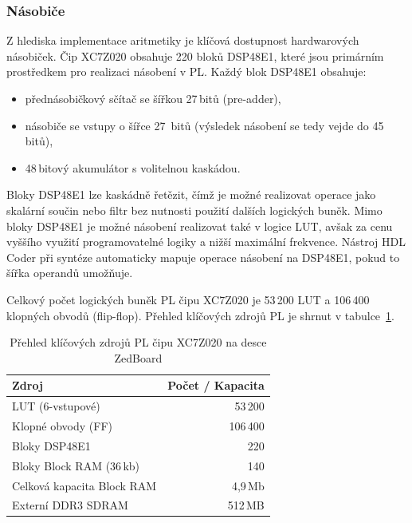 \subsubsection{Násobiče}

Z hlediska implementace aritmetiky je klíčová dostupnost hardwarových násobiček. Čip XC7Z020 obsahuje 220 bloků DSP48E1, které jsou primárním prostředkem pro realizaci násobení v PL. Každý blok DSP48E1 obsahuje:
\begin{itemize}
    \item přednásobičkový sčítač se šířkou 27\,bitů (pre-adder),
    \item násobiče se vstupy o šířce 27~bitů (výsledek násobení se tedy vejde do 45\,bitů),
    \item 48\,bitový akumulátor s volitelnou kaskádou.
\end{itemize}

Bloky DSP48E1 lze kaskádně řetězit, čímž je možné realizovat operace jako skalární součin nebo filtr bez nutnosti použití dalších logických buněk. Mimo bloky DSP48E1 je možné násobení realizovat také v logice LUT, avšak za cenu vyššího využití programovatelné logiky a nižší maximální frekvence. Nástroj HDL Coder při syntéze automaticky mapuje operace násobení na DSP48E1, pokud to šířka operandů umožňuje.\cite{zedBoard1} \cite{zedBoard2}

Celkový počet logických buněk PL čipu XC7Z020 je 53\,200 LUT a 106\,400 klopných obvodů (flip-flop). Přehled klíčových zdrojů PL je shrnut v tabulce~\ref{tab:zedboard_zdroje}.\cite{zedBoard1} \cite{zedBoard2}

\begin{table}[h]
    \centering
    \begin{tabular}{|l|r|}
    \hline 
    Zdroj & Počet / Kapacita \\ \hline
    LUT (6-vstupové) & 53\,200 \\
    Klopné obvody (FF) & 106\,400 \\
    Bloky DSP48E1 & 220 \\
    Bloky Block RAM (36\,kb) & 140 \\
    Celková kapacita Block RAM & 4{,}9\,Mb \\
    Externí DDR3 SDRAM & 512\,MB \\ \hline
    \end{tabular}
    \caption{Přehled klíčových zdrojů PL čipu XC7Z020 na desce ZedBoard}
    \label{tab:zedboard_zdroje}
\end{table}

